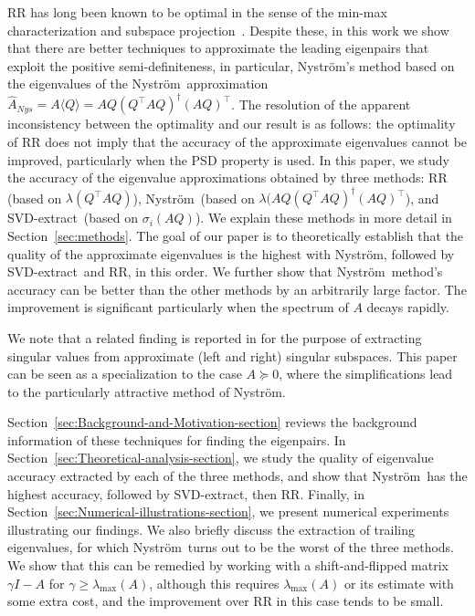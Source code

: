 \documentclass[onefignum,onetabnum]{siamart251216}
\def\Nystrom{Nystr{\"o}m}
\def\svdmethod{SVD-extract}
\begin{document}
RR has long been known to be optimal in the sense of the min-max characterization and subspace projection~\cite[Ch.~11]{parlett1998symmetric}. Despite these, in this work we show that there are better techniques to approximate the leading eigenpairs that exploit the positive semi-definiteness, in particular, \Nystrom's method based on the eigenvalues of the \Nystrom\ approximation $\hat{A}_{Nys} = A \langle Q \rangle= AQ (Q^\top A Q)^{\dagger} (AQ)^\top$. The resolution of the apparent inconsistency between the optimality and our result is as follows: the optimality of RR does not imply that the accuracy of the approximate eigenvalues cannot be improved, particularly when the PSD property is used. In this paper, we study the accuracy of the eigenvalue approximations obtained by three methods: RR (based on $\lambda(Q^\top AQ)$), \Nystrom\ (based on $\lambda(AQ (Q^\top A Q)^{\dagger} (AQ)^\top$), and \svdmethod\ (based on $\sigma_i(AQ)$). We explain these methods in more detail in Section~\ref{sec:methods}. The goal of our paper is to theoretically establish that the quality of the approximate eigenvalues is the highest with \Nystrom, followed by \svdmethod\ and RR, in this order. We further show that \Nystrom\ method's accuracy can be better than the other methods by an arbitrarily large factor. The improvement is significant particularly when the spectrum of $A$ decays rapidly. 

We note that a related finding is reported in \cite{lazzarino2025matrix} for the purpose of extracting singular values from approximate (left and right) singular subspaces. This paper can be seen as a specialization to the case $A\succeq 0$, where the simplifications lead to the particularly attractive method of \Nystrom.

Section~\ref{sec:Background-and-Motivation-section} reviews the background information of these techniques for finding the eigenpairs. In Section~\ref{sec:Theoretical-analysis-section}, we study the quality of eigenvalue accuracy extracted by each of the three methods, and show that \Nystrom\ has the highest accuracy, followed by \svdmethod, then RR. Finally, in Section~\ref{sec:Numerical-illustrations-section}, we present numerical experiments illustrating our findings. We also briefly discuss the extraction of trailing eigenvalues, for which \Nystrom\ turns out to be the worst of the three methods. We show that this can be remedied by working with a shift-and-flipped matrix $\gamma I-A$ for $\gamma\geq \lambda_{\max}(A)$, although this requires $\lambda_{\max}(A)$ or its estimate with some extra cost, and the improvement over RR in this case tends to be small.
 
\end{document}
